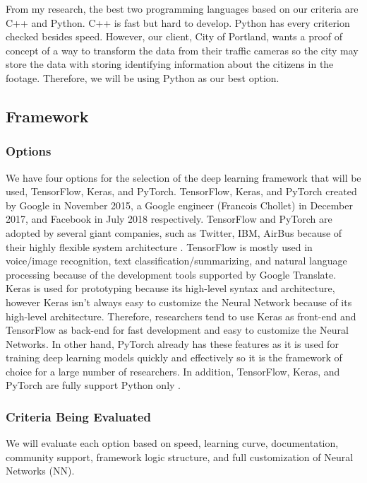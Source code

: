From my research, the best two programming languages based on our criteria are C++ and Python. C++ is fast but hard to develop. Python has every criterion checked besides speed. However, our client, City of Portland, wants a proof of concept of a way to transform the data from their traffic cameras so the city may store the data with storing identifying information about the citizens in the footage. Therefore, we will be using Python as our best option.

\subsection{Framework}

\subsubsection{Options}

We have four options for the selection of the deep learning framework that will be used, TensorFlow, Keras, and PyTorch. TensorFlow, Keras, and PyTorch created by Google in November 2015, a Google engineer (Francois Chollet) in December 2017, and Facebook in July 2018 respectively. TensorFlow and PyTorch are adopted by several giant companies, such as Twitter, IBM, AirBus because of their highly flexible system architecture \cite{plf1}. TensorFlow is mostly used in voice/image recognition, text classification/summarizing, and natural language processing because of the development tools supported by Google Translate. Keras is used for prototyping because its high-level syntax and architecture, however Keras isn't always easy to customize the Neural Network because of its high-level architecture. Therefore, researchers tend to use Keras as front-end and TensorFlow as back-end for fast development and easy to customize the Neural Networks. In other hand, PyTorch already has these features as it is used for training deep learning models quickly and effectively so it is the framework of choice for a large number of researchers. In addition, TensorFlow, Keras, and PyTorch are fully support Python only \cite{plf2}.

\subsubsection{Criteria Being Evaluated}

We will evaluate each option based on speed, learning curve, documentation, community support, framework logic structure, and full customization of Neural Networks (NN).

